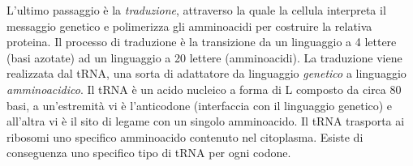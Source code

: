 \par L'ultimo passaggio è la \textit{traduzione}, attraverso la quale la cellula interpreta il messaggio genetico e polimerizza gli amminoacidi per costruire la relativa proteina. Il processo di traduzione è la transizione da un linguaggio a 4 lettere (basi azotate) ad un linguaggio a 20 lettere (amminoacidi). La traduzione viene realizzata dal tRNA, una sorta di adattatore da linguaggio \textit{genetico }a linguaggio \textit{amminoacidico}. Il tRNA è un acido nucleico a forma di L composto da circa 80 basi, a un'estremità vi è l'anticodone (interfaccia con il linguaggio genetico) e all'altra vi è il sito di legame con un singolo amminoacido. Il tRNA trasporta ai ribosomi uno specifico amminoacido contenuto nel citoplasma. Esiste di conseguenza uno specifico tipo di tRNA per ogni codone.

